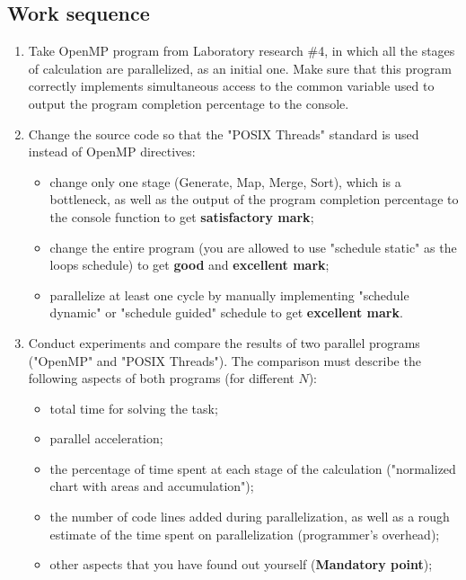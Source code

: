 { %
	\subsection{Work sequence}
	\begin{enumerate}
		\item Take OpenMP program from Laboratory research \#4, in which all the stages of calculation are parallelized, as an initial one. Make sure that this program correctly implements simultaneous access to the common variable used to output the program completion percentage to the console.
		\item Change the source code so that the "POSIX Threads" standard is used instead of OpenMP directives:
			\begin{itemize}
				\item change only one stage (Generate, Map, Merge, Sort), which is a bottleneck, as well as the output of the program completion percentage to the console function to get \textbf{satisfactory mark};
				\item change the entire program (you are allowed to use "schedule static" as the loops schedule) to get \textbf{good} and \textbf{excellent mark};
				\item parallelize at least one cycle by manually implementing "schedule dynamic" or "schedule guided" schedule to get \textbf{excellent mark}.
			\end{itemize}
		\item Conduct experiments and compare the results of two parallel programs ("OpenMP" and "POSIX Threads"). The comparison must describe the following aspects of both programs (for different $N$):
			\begin{itemize}
				\item total time for solving the task;
				\item parallel acceleration;
				\item the percentage of time spent at each stage of the calculation ("normalized chart with areas and accumulation");
				\item the number of code lines added during parallelization, as well as a rough estimate of the time spent on parallelization (programmer's overhead);
				\item other aspects that you have found out yourself (\textbf{Mandatory point});
			\end{itemize}
	\end{enumerate}
}
